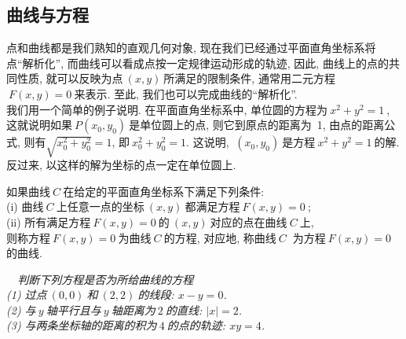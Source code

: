     \subsection{曲线与方程}
    点和曲线都是我们熟知的直观几何对象, 现在我们已经通过平面直角坐标系将点“解析化”, 而曲线可以看成点按一定规律运动形成的轨迹, 因此, 曲线上的点的共同性质, 就可以反映为点$\ (x,y)\ $所满足的限制条件, 通常用二元方程$\ F(x,y)=0\ $来表示. 至此, 我们也可以完成曲线的“解析化”.\\
    \indent 我们用一个简单的例子说明. 在平面直角坐标系中, 单位圆的方程为$\ x^2+y^2=1\ $, 这就说明如果$\ P(x_{0},y_{0})\ $是单位圆上的点, 则它到原点的距离为\ 1, 由点的距离公式, 则有$\sqrt{x_{0}^2+y_{0}^2}=1$, 即$\ x_{0}^2+y_{0}^2=1$. 这说明, $\ (x_{0},y_{0})\ $是方程$\ x^2+y^2=1\ $的解. 反过来, 以这样的解为坐标的点一定在单位圆上.
    \begin{define}
    如果曲线$\ C\ $在给定的平面直角坐标系下满足下列条件: \\
    \indent (i) 曲线$\ C\ $上任意一点的坐标$\ (x,y)\ $都满足方程$\ F(x,y)=0\ $;\\
    \indent (ii) 所有满足方程$\ F(x,y)=0\ $的$\ (x,y)\ $对应的点在曲线$\ C\ $上,\\
    则称方程$\ F(x,y)=0\ $为曲线$\ C\ $的方程, 对应地, 称曲线$\ C\ $ 为方程$\ F(x,y)=0\ $ 的曲线.
    \end{define}
    \begin{figure}[h]
        \centering
    \end{figure}
    {\it {}\ \ 判断下列方程是否为所给曲线的方程\\
    \indent \indent (1) 过点$\ (0,0)\ $和$\ (2,2)\ $的线段: $x-y=0$.\\
    \indent \indent (2) 与$\ y\ $轴平行且与$\ y\ $轴距离为$\ 2\ $的直线: $|x|=2$. \\
    \indent \indent (3) 与两条坐标轴的距离的积为$\ 4\ $的点的轨迹: $xy=4$.}
